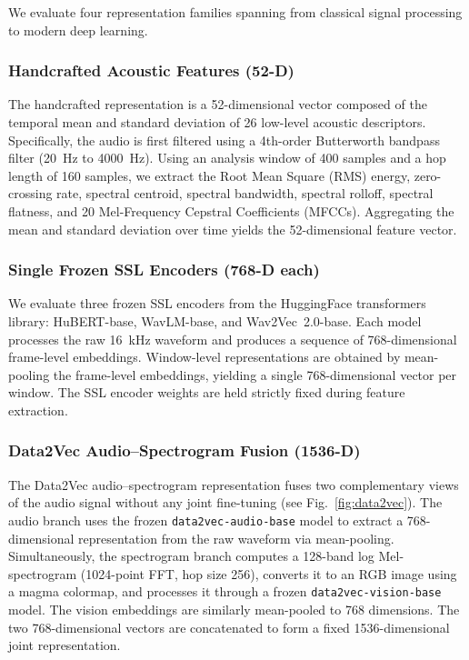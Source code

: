 \documentclass[conference]{IEEEtran}
\begin{document}
We evaluate four representation families spanning from classical signal processing to
modern deep learning.

\subsubsection{Handcrafted Acoustic Features (52-D)}
The handcrafted representation is a 52-dimensional vector composed of the temporal mean
and standard deviation of 26 low-level acoustic descriptors. Specifically, the audio is
first filtered using a 4th-order Butterworth bandpass filter (20~Hz to 4000~Hz). Using an
analysis window of 400 samples and a hop length of 160 samples, we extract the Root Mean Square (RMS) energy, 
zero-crossing rate, spectral centroid, spectral bandwidth, spectral rolloff, spectral flatness, 
and 20 Mel-Frequency Cepstral Coefficients (MFCCs). Aggregating the mean and standard deviation 
over time yields the 52-dimensional feature vector.

\subsubsection{Single Frozen SSL Encoders (768-D each)}
We evaluate three frozen SSL encoders from the HuggingFace transformers library:
HuBERT-base, WavLM-base, and Wav2Vec~2.0-base. Each model processes the raw 16~kHz
waveform and produces a sequence of 768-dimensional frame-level embeddings.
Window-level representations are obtained by mean-pooling the frame-level embeddings,
yielding a single 768-dimensional vector per window. The SSL encoder weights are held
strictly fixed during feature extraction.

\subsubsection{Data2Vec Audio--Spectrogram Fusion (1536-D)}
The Data2Vec audio--spectrogram representation fuses two complementary views of the
audio signal without any joint fine-tuning (see Fig.~\ref{fig:data2vec}). The audio branch uses the frozen 
\texttt{data2vec-audio-base} model to extract a 768-dimensional representation from the raw waveform via mean-pooling. 
Simultaneously, the spectrogram branch computes a 128-band log Mel-spectrogram (1024-point FFT, 
hop size 256), converts it to an RGB image using a magma colormap, and processes it through a frozen 
\texttt{data2vec-vision-base} model. The vision embeddings are similarly mean-pooled to 768 dimensions. 
The two 768-dimensional vectors are concatenated to form a fixed 1536-dimensional joint representation.
\end{document}
